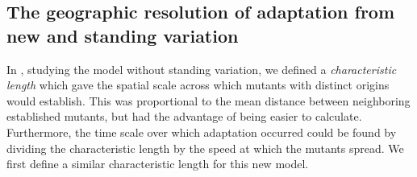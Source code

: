 \documentclass{article}
\begin{document}






\subsection{The geographic resolution of adaptation from new and standing variation}


In \citet{ralphcoop2010}, studying the model without standing variation,
we defined a {\em characteristic length} which gave the spatial scale across which mutants with distinct origins would establish.
This was proportional to the mean distance between neighboring established mutants,
but had the advantage of being easier to calculate.
Furthermore, the time scale over which adaptation occurred could be found by dividing the characteristic length 
by the speed at which the mutants spread.
We first define a similar characteristic length for this new model. %
\end{document}
